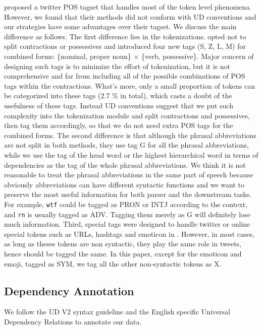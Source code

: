 \documentclass[11pt,letterpaper]{article}
\begin{document}
 proposed a twitter POS tagset that handles most of the token level phenomena. However, we found that their methods did not conform with UD conventions and our strategies have some advantages over their tagset. We discuss the main difference as follows.
The first difference lies in the tokenizations.
 opted not to split contractions or possessives and introduced four new tags (S, Z, L, M) for combined forms: \{nominal, proper noun\} $\times$ \{verb, possessive\}. 
Major concern of designing such tags is to minimize the effort of tokenization, but it is not comprehensive and far from including all of the possible combinations of POS tags within the contractions. 
What's more, only a small proportion of tokens can be categorized into these tags (2.7 \% in total), which casts a doubt of the usefulness of these tags.
Instead UD conventions suggest that we put such complexity into the tokenization module and split contractions and possessives, then tag them accordingly, so that we do not need extra POS tags for the combined forms.
The second difference is that although the phrasal abbreviations are not split in both methods, they use tag G for all the phrasal abbreviations, while we use the tag of the head word or the highest hierarchical word in terms of dependencies as the tag of the whole phrasal abbreviations. 
We think it is not reasonable to treat the phrasal abbreviations in the same part of speech because obviously abbreviations can have different syntactic functions and we want to preserve the most useful information for both parser and the downstream tasks. For example, {\tt wtf} could be tagged as PRON or INTJ according to the context, and {\tt rn} is usually tagged as ADV. Tagging them merely as G will definitely lose much information.
Third, special tags were designed to handle twitter or online special tokens such as URLs, hashtags and emoticon in . However, in most cases, as long as theses tokens are non syntactic, they play the same role in tweets, hence should be tagged the same. In this paper, except for the emoticon and emoji, tagged as SYM, we tag all the other non-syntactic tokens as X.


\subsection{Dependency Annotation}
We follow the UD V2 syntax guideline and the English specific Universal Dependency Relations to annotate our data.
\end{document}
